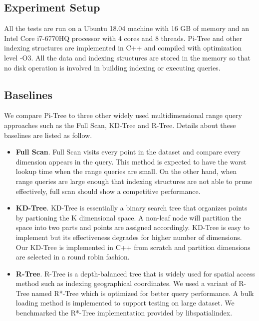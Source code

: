 \documentclass[sigconf,10pt]{acmart}
\begin{document}
\subsection{Experiment Setup}

All the tests are run on a Ubuntu 18.04 machine with 16 GB of memory and an Intel 
Core i7-6770HQ processor with 4 cores and 8 threads. Pi-Tree and other indexing 
structures are implemented in C++ and compiled with optimization level -O3. 
All the data and indexing structures are stored in the memory so that no disk 
operation is involved in building indexing or executing queries.

\subsection{Baselines}

We compare Pi-Tree to three other widely used multidimensional range query approaches 
such as the Full Scan, KD-Tree and R-Tree. Details about these baselines are listed 
as follow. 
\begin{itemize}
    \item \textbf{Full Scan}. Full Scan visits every point in the dataset and 
    compare every dimension appears in the query. This method is expected to have 
    the worst lookup time when the range queries are small. On the other hand, 
    when range queries are large enough that indexing structures are not able to 
    prune effectively, full scan should show a competitive performance.
    \item \textbf{KD-Tree}. KD-Tree is essentially a binary search tree that organizes
    points by partioning the K dimensional space. A non-leaf node will partition 
    the space into two parts and points are assigned accordingly. KD-Tree is easy to 
    implement but its effectiveness degrades for higher number of dimensions. Our KD-Tree is
    implemented in C++ from scratch and partition dimensions are selected in a round robin fashion.
    \item \textbf{R-Tree}. R-Tree is a depth-balanced tree that is widely used for spatial
    access method such as indexing geographical coordinates. We used a variant of R-Tree named
    R*-Tree which is optimized for better query performance. A bulk loading method is
    implemented to support testing on large dataset. We benchmarked the R*-Tree implementation
    provided by libspatialindex.\cite{libSpatialIndex}

\end{itemize}
\end{document}
